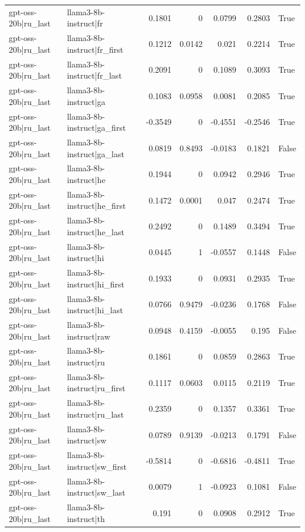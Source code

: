 \begin{table}
\begin{tabular}{l l r r r r l}
gpt-oss-20b|ru_last & llama3-8b-instruct|fr & 0.1801 & 0 & 0.0799 & 0.2803 & True \\
gpt-oss-20b|ru_last & llama3-8b-instruct|fr_first & 0.1212 & 0.0142 & 0.021 & 0.2214 & True \\
gpt-oss-20b|ru_last & llama3-8b-instruct|fr_last & 0.2091 & 0 & 0.1089 & 0.3093 & True \\
gpt-oss-20b|ru_last & llama3-8b-instruct|ga & 0.1083 & 0.0958 & 0.0081 & 0.2085 & True \\
gpt-oss-20b|ru_last & llama3-8b-instruct|ga_first & -0.3549 & 0 & -0.4551 & -0.2546 & True \\
gpt-oss-20b|ru_last & llama3-8b-instruct|ga_last & 0.0819 & 0.8493 & -0.0183 & 0.1821 & False \\
gpt-oss-20b|ru_last & llama3-8b-instruct|he & 0.1944 & 0 & 0.0942 & 0.2946 & True \\
gpt-oss-20b|ru_last & llama3-8b-instruct|he_first & 0.1472 & 0.0001 & 0.047 & 0.2474 & True \\
gpt-oss-20b|ru_last & llama3-8b-instruct|he_last & 0.2492 & 0 & 0.1489 & 0.3494 & True \\
gpt-oss-20b|ru_last & llama3-8b-instruct|hi & 0.0445 & 1 & -0.0557 & 0.1448 & False \\
gpt-oss-20b|ru_last & llama3-8b-instruct|hi_first & 0.1933 & 0 & 0.0931 & 0.2935 & True \\
gpt-oss-20b|ru_last & llama3-8b-instruct|hi_last & 0.0766 & 0.9479 & -0.0236 & 0.1768 & False \\
gpt-oss-20b|ru_last & llama3-8b-instruct|raw & 0.0948 & 0.4159 & -0.0055 & 0.195 & False \\
gpt-oss-20b|ru_last & llama3-8b-instruct|ru & 0.1861 & 0 & 0.0859 & 0.2863 & True \\
gpt-oss-20b|ru_last & llama3-8b-instruct|ru_first & 0.1117 & 0.0603 & 0.0115 & 0.2119 & True \\
gpt-oss-20b|ru_last & llama3-8b-instruct|ru_last & 0.2359 & 0 & 0.1357 & 0.3361 & True \\
gpt-oss-20b|ru_last & llama3-8b-instruct|sw & 0.0789 & 0.9139 & -0.0213 & 0.1791 & False \\
gpt-oss-20b|ru_last & llama3-8b-instruct|sw_first & -0.5814 & 0 & -0.6816 & -0.4811 & True \\
gpt-oss-20b|ru_last & llama3-8b-instruct|sw_last & 0.0079 & 1 & -0.0923 & 0.1081 & False \\
gpt-oss-20b|ru_last & llama3-8b-instruct|th & 0.191 & 0 & 0.0908 & 0.2912 & True \\

\end{tabular}
\end{table}
